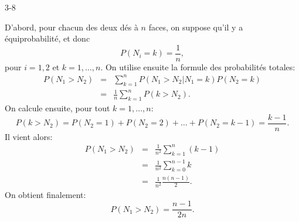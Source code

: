 \begin{corrige}{3-8}

D'abord, pour chacun des deux dés à $n$ faces, on suppose qu'il y a équiprobabilité, et donc
\[
 P ( N_i = k ) = \frac1n,
\]
pour $i=1,2$ et $k=1,\ldots,n$. On utilise ensuite la formule des probabilités totales:
\begin{eqnarray*}
 P ( N_1 > N_2 ) & = & \sum_{k=1}^n P(N_1 > N_2 | N_1=k) P(N_2=k)\\
 & = & \frac1n \sum_{k=1}^n P ( k > N_2 ).
\end{eqnarray*}
On calcule ensuite, pour tout $k=1,\ldots,n$:
\[
 P ( k > N_2 ) = P ( N_2 = 1 ) + P(N_2 = 2) + \ldots + P(N_2 = k-1) = \frac{k-1}n.
\]
Il vient alors:
\begin{eqnarray*}
 P ( N_1 > N_2 ) 
 & = & \frac1{n^2} \sum_{k=1}^n (k-1)\\
 & = & \frac1{n^2} \sum_{k=0}^{n-1} k\\
 & = & \frac1{n^2} \frac{n(n-1)}2.
\end{eqnarray*}
On obtient finalement:
  $$P ( N_1 > N_2 )  = \frac{n-1}{2n}.$$


\end{corrige}
